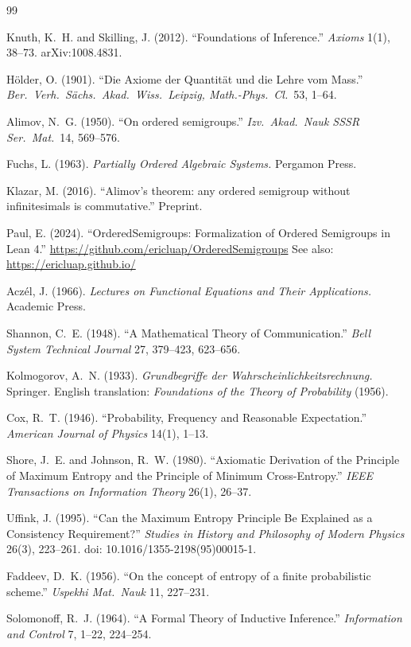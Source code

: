 \documentclass[11pt]{article}
\theoremstyle{definition}
\theoremstyle{remark}
\begin{document}
\begin{thebibliography}{99}

Knuth, K.~H. and Skilling, J. (2012).
``Foundations of Inference.''
\emph{Axioms} 1(1), 38--73.
arXiv:1008.4831.

H\"older, O. (1901).
``Die Axiome der Quantit\"at und die Lehre vom Mass.''
\emph{Ber.\ Verh.\ S\"achs.\ Akad.\ Wiss.\ Leipzig, Math.-Phys.\ Cl.}\ 53, 1--64.

Alimov, N.~G. (1950).
``On ordered semigroups.''
\emph{Izv.\ Akad.\ Nauk SSSR Ser.\ Mat.}\ 14, 569--576.

Fuchs, L. (1963).
\emph{Partially Ordered Algebraic Systems.}
Pergamon Press.

Klazar, M. (2016).
``Alimov's theorem: any ordered semigroup without infinitesimals is commutative.''
Preprint.

Paul, E. (2024).
``OrderedSemigroups: Formalization of Ordered Semigroups in Lean 4.''
\url{https://github.com/ericluap/OrderedSemigroups}
See also: \url{https://ericluap.github.io/}

Acz\'el, J. (1966).
\emph{Lectures on Functional Equations and Their Applications.}
Academic Press.

Shannon, C.~E. (1948).
``A Mathematical Theory of Communication.''
\emph{Bell System Technical Journal} 27, 379--423, 623--656.

Kolmogorov, A.~N. (1933).
\emph{Grundbegriffe der Wahrscheinlichkeitsrechnung.}
Springer.
English translation: \emph{Foundations of the Theory of Probability} (1956).

Cox, R.~T. (1946).
``Probability, Frequency and Reasonable Expectation.''
\emph{American Journal of Physics} 14(1), 1--13.

Shore, J.~E. and Johnson, R.~W. (1980).
``Axiomatic Derivation of the Principle of Maximum Entropy and the Principle of Minimum Cross-Entropy.''
\emph{IEEE Transactions on Information Theory} 26(1), 26--37.

Uffink, J. (1995).
``Can the Maximum Entropy Principle Be Explained as a Consistency Requirement?''
\emph{Studies in History and Philosophy of Modern Physics} 26(3), 223--261.
doi: 10.1016/1355-2198(95)00015-1.

Faddeev, D.~K. (1956).
``On the concept of entropy of a finite probabilistic scheme.''
\emph{Uspekhi Mat.\ Nauk} 11, 227--231.

Solomonoff, R.~J. (1964).
``A Formal Theory of Inductive Inference.''
\emph{Information and Control} 7, 1--22, 224--254.

\end{thebibliography}
\end{document}
